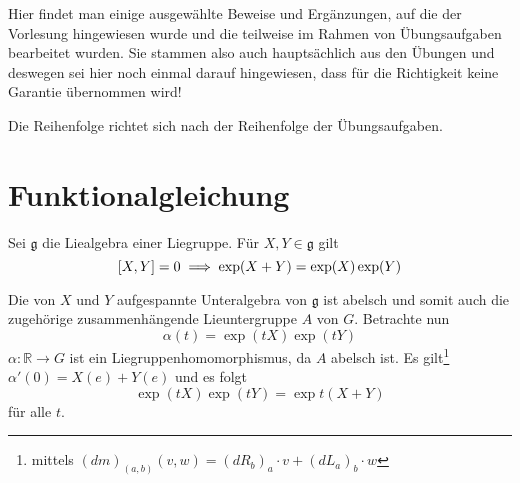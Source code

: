 Hier findet man einige ausgewählte Beweise und Ergänzungen, auf die der Vorlesung hingewiesen wurde und die teilweise im Rahmen von Übungsaufgaben bearbeitet wurden.
Sie stammen also auch hauptsächlich aus den Übungen und deswegen sei hier noch einmal darauf hingewiesen, dass für die Richtigkeit keine Garantie übernommen wird!

Die Reihenfolge richtet sich nach der Reihenfolge der Übungsaufgaben.

\section{Funktionalgleichung} %
\label{sec:funktionalgleichung}
Sei $\mathfrak{g}$ die Liealgebra einer Liegruppe.
Für $X,Y \in \mathfrak{g}$ gilt
\[
	\benbrace*{X,Y} = 0 \implies \exp(X+Y) = \exp(X) \exp(Y)
\]
\begin{beweis}
	Die von $X$ und $Y$ aufgespannte Unteralgebra von $\mathfrak{g}$ ist abelsch und somit auch die zugehörige zusammenhängende Lieuntergruppe $A$ von $G$.
	Betrachte nun
	\[
		\alpha(t) = \exp(t X) \exp(t Y)
	\]
	$\alpha \colon \mathbb{R} \to G$ ist ein Liegruppenhomomorphismus, da $A$ abelsch ist.
	Es gilt\footnote{mittels $(d m)_{(a,b)}(v,w) = (d R_b)_a \cdot v + (d L_a)_b \cdot w$} $\alpha'(0) = X(e) + Y(e)$ und es folgt
	\[
		\exp(t X) \exp(tY) = \exp t (X+Y)
	\]
	für alle $t$.
\end{beweis}

